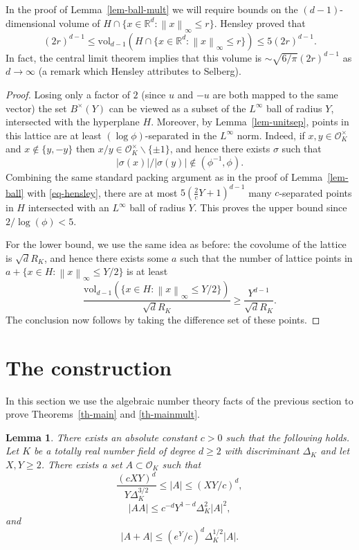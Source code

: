 \documentclass{amsart}
\numberwithin{equation}{section}
\newcommand{\abs}[1]{\mathopen{}\left| #1\mathclose{}\right|}
\newcommand{\norm}[1]{\mathopen{}\left\| #1\mathclose{}\right\|}
\newcommand{\bbr}{\mathbb{R}}
\newcommand{\Abs}[1]{\lvert #1\rvert}
\newtheorem{lemma}[theorem]{Lemma}
\begin{document}
In the proof of Lemma~\ref{lem-ball-mult} we will require bounds on the $(d-1)$-dimensional volume of $H\cap \{ x\in \bbr^d : \norm{x}_\infty \leq r\}$. Hensley \cite{He79} proved that 
\begin{equation}\label{eq-hensley}
    (2r)^{d-1}\leq \mathrm{vol}_{d-1}(H\cap \{ x\in \bbr^d : \norm{x}_\infty \leq r\})\leq 5(2r)^{d-1}.
\end{equation}
In fact, the central limit theorem implies that this volume is $\sim \sqrt{6/\pi}(2r)^{d-1}$ as $d\to \infty$ (a remark which Hensley attributes to Selberg).

\begin{proof}
Losing only a factor of $2$ (since $u$ and $-u$ are both mapped to the same vector) the set $B^\times(Y)$ can be viewed as a subset of the $L^\infty$ ball of radius $Y$, intersected with the hyperplane $H$. Moreover, by Lemma~\ref{lem-unitsep}, points in this lattice are at least $(\log \phi)$-separated in the $L^\infty$ norm. Indeed, if $x,y\in \mathcal{O}_K^\times$ and $x\not\in \{y,-y\}$ then $x/y\in \mathcal{O}_K^\times \backslash \{\pm 1\}$, and hence there exists $\sigma$ such that
\[ \Abs{\sigma(x)}/\Abs{\sigma(y)} \not\in(\phi^{-1},\phi).\]
Combining the same standard packing argument as in the proof of Lemma~\ref{lem-ball} with \eqref{eq-hensley}, there are at most $5(\frac{2}{c}Y+1)^{d-1}$ many $c$-separated points in $H$ intersected with an $L^\infty$ ball of radius $Y$. This proves the upper bound since $2/\log(\phi)<5$.

For the lower bound, we use the same idea as before: the covolume of the lattice is $\sqrt{d}R_K$, and hence there exists some $a$ such that the number of lattice points in $a+\{ x\in H : \norm{x}_\infty \leq Y/2\}$ is at least 
\[\frac{\mathrm{vol}_{d-1}(\{ x\in H: \norm{x}_\infty \leq Y/2\})}{\sqrt{d}R_K}\geq \frac{Y^{d-1}}{\sqrt{d}R_K}.\]
The conclusion now follows by taking the difference set of these points. 
\end{proof}


\section{The construction}
In this section we use the algebraic number theory facts of the previous section to prove Theorems~\ref{th-main} and \ref{th-mainmult}.

\begin{lemma}\label{lem-main}
There exists an absolute constant $c>0$ such that the following holds. Let $K$ be a totally real number field of degree $d\geq 2$ with discriminant $\Delta_K$ and let $X,Y\geq 2$. There exists a set $A\subset \mathcal{O}_K$ such that
\[\frac{(cXY)^d}{Y\Delta_K^{3/2}}\leq \abs{A}\leq (XY/c)^d,\]
\[\Abs{AA}\leq c^{-d}Y^{1-d}\Delta_K^2\abs{A}^2,\]
and
\[\abs{A+A}\leq (e^Y/c)^d\Delta_K^{1/2}\abs{A}.\]
\end{lemma}
\end{document}
